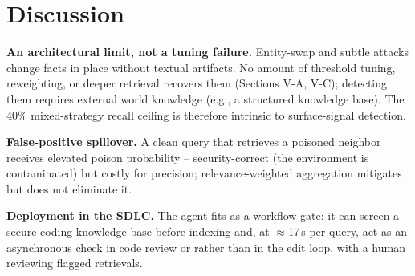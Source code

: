 \section{Discussion}
\label{sec:discussion}


\textbf{An architectural limit, not a tuning failure.} Entity-swap and subtle attacks change facts in place without textual artifacts. No amount of threshold tuning, reweighting, or deeper retrieval recovers them (Sections V-A, V-C); detecting them requires external world knowledge (e.g., a structured knowledge base). The 40\% mixed-strategy recall ceiling is therefore intrinsic to surface-signal detection.

\textbf{False-positive spillover.} A clean query that retrieves a poisoned neighbor receives elevated poison probability -- security-correct (the environment is contaminated) but costly for precision; relevance-weighted aggregation mitigates but does not eliminate it.

\textbf{Deployment in the SDLC.} The agent fits as a workflow gate: it can screen a secure-coding knowledge base before indexing and, at $\approx$17\,s per query, act as an asynchronous check in code review or  rather than in the edit loop, with a human reviewing flagged retrievals.

